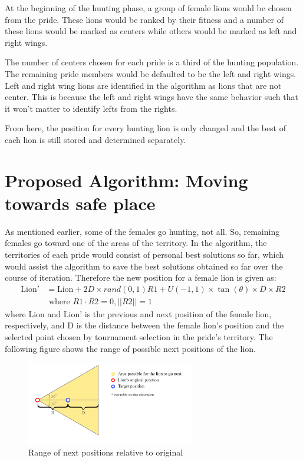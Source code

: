 At the beginning of the hunting phase, a group of female lions would be chosen from the pride. These lions would be ranked by their fitness and a number of these lions would be marked as centers while others would be marked as left and right wings.

The number of centers chosen for each pride is a third of the hunting population. The remaining pride members would be defaulted to be the left and right wings. Left and right wing lions are identified in the algorithm as lions that are not center. This is because the left and right wings have the same behavior such that it won't matter to identify lefts from the rights.

From here, the position for every hunting lion is only changed and the best of each lion is still stored and determined separately.

\section{Proposed Algorithm: Moving towards safe place}

As mentioned earlier, some of the females go hunting, not all. So, remaining females go toward one of the areas of the territory. In the algorithm, the territories of each pride would consist of personal best solutions so far, which would assist the algorithm to save the best solutions obtained so far over the course of iteration.
Therefore the new position for a female lion is given as:
\begin{align*}
\text{Lion}' &= \text{Lion} + 2D \times rand(0,1){R1} + U(-1,1) \times \tan(\theta) \times D \times {R2} \\
&\text{  where } R1 \cdot R2 = 0, ||R2|| = 1
\end{align*}
where Lion and Lion' is the previous and next position of the female lion, respectively, and D is the distance between the female lion's position and the selected point chosen by tournament selection in the pride's territory. The following figure shows the range of possible next positions of the lion.

\begin{figure}[h]
\begin{center}
\includegraphics[width=0.65\textwidth]{img/moving/moving}
\caption{Range of next positions relative to original}
\end{center}
\end{figure}


